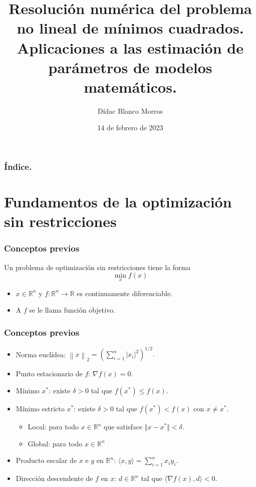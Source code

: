 \documentclass{beamer}
\title
{Resolución numérica del problema no lineal de mínimos cuadrados.
Aplicaciones a las estimación de parámetros de modelos matemáticos.}
\author
{Dídac Blanco Morros}
\date
{14 de febrero de 2023}
\newcommand{\norm}[1]{\left\lVert#1\right\rVert}
\begin{document}
\frame{\titlepage}

\begin{frame}
\frametitle{Índice.} %
\tableofcontents
\end{frame}

\section{Fundamentos de la optimización sin restricciones}
\begin{frame}
    \frametitle{Conceptos previos}
    \begin{block}{}
        Un problema de optimización sin restricciones tiene la forma
        \begin{equation*}
            \min_x f(x)
        \end{equation*}
        \end{block}
    \begin{itemize}
        \item $x\in \mathbb{R}^n$ y $f:\mathbb{R}^n \to \mathbb{R}$ es continuamente diferenciable.
        \item A $f$ se le llama función objetivo.
    \end{itemize}
\end{frame}

\begin{frame}
    \frametitle{Conceptos previos}
    \pause
    \begin{itemize}[label=\textbullet]
    \item Norma euclídea: $
            \norm{x}_2 = \left( \sum_{i=1}^n \vert x_i \vert^2 \right)^{1/2}.
        $\pause
    \item Punto estacionario de $f$: $\nabla f(x) = 0$.\pause 
    \item Mínimo $x^*$: existe $\delta > 0$ tal que $f(x^*) \leq f(x)$.
    \item Mínimo estricto $x^*$: existe $\delta > 0$ tal que $f(x^*) < f(x)$ con $x \neq x^*$.
    \begin{itemize}[label=-]
        \item Local: para todo $x \in \mathbb{R}^n$ que satisface $\Vert x - x^* \Vert < \delta$. 
        \item Global: para todo $x \in \mathbb{R}^n$
    \end{itemize}\pause 
    \item Producto escalar de $x$ e $y$ en $\mathbb{R}^n$: $\langle x,y \rangle = \sum_{i=1}^n x_i y_i$.\pause 
    \item Dirección descendente de $f$ en $x$: $d \in \mathbb{R}^n$ tal que $\langle \nabla f(x), d \rangle < 0$.
    \end{itemize}
\end{frame}
\end{document}
